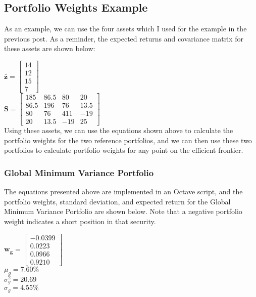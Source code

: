 \documentclass[12pt,a4paper]{article}
\begin{document}
\subsection{Portfolio Weights Example}
As an example, we can use the four assets which I used for the example in the previous post.  As a reminder, the expected returns and covariance matrix for these assets are shown below:

$\mathbf{\bar{z}}=\begin{bmatrix} 14\\ 12\\ 15\\ 7 \end{bmatrix}$\\

$\mathbf{S}=\begin{bmatrix} 185& 86.5& 80& 20\\ 86.5& 196& 76& 13.5\\ 80& 76& 411& -19\\ 20& 13.5& -19& 25 \end{bmatrix}$\\

Using these assets, we can use the equations shown above to calculate the portfolio weights for the two reference portfolios, and we can then use these two portfolios to calculate portfolio weights for any point on the efficient frontier.

\subsubsection{Global Minimum Variance Portfolio}
The equations presented above are implemented in an Octave script, and the portfolio weights, standard deviation, and expected return for the Global Minimum Variance Portfolio are shown below.  Note that a negative portfolio weight indicates a short position in that security.

$\mathbf{w_{g}}=\begin{bmatrix} -0.0399\\ 0.0223\\ 0.0966\\ 0.9210 \end{bmatrix}$\\

$\mu_{g}=7.60\%$\\

$\sigma^{2}_{g}=20.69$\\

$\sigma_{g}=4.55\%$\\
\end{document}
